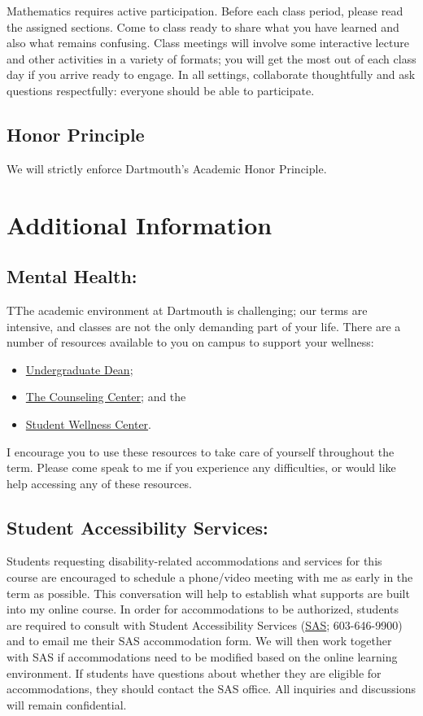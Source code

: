 \documentclass[11pt,letterpaper]{article}
\newcommand{\pageheading}[1]{\section*{#1}\addcontentsline{toc}{section}{#1}}
\begin{document}
Mathematics requires active participation. Before each class period, please read the assigned sections. Come to class ready to share what you have learned and also what remains confusing. Class meetings will involve some interactive lecture and other activities in a variety of formats; you will get the most out of each class day if you arrive ready to engage. In all settings, collaborate thoughtfully and ask questions respectfully: everyone should be able to participate.

\subsection*{Honor Principle}

We will strictly enforce Dartmouth's Academic Honor Principle.

\clearpage
\pageheading{Additional Information}

\subsection*{Mental Health:}

TThe academic environment at Dartmouth is challenging; our terms are intensive, and classes are not the only demanding part of your life. There are a number of resources available to you on campus to support your wellness:

\begin{itemize}
\item \href{https://students.dartmouth.edu/undergraduate-deans/}{Undergraduate Dean};
\item \href{https://students.dartmouth.edu/health-service/counseling/about}{The Counseling Center}; and the
\item \href{https://students.dartmouth.edu/wellness-center/}{Student Wellness Center}.
\end{itemize}

I encourage you to use these resources to take care of yourself throughout the term. Please come speak to me if you experience any difficulties, or would like help accessing any of these resources.

\subsection*{Student Accessibility Services:}

Students requesting disability-related accommodations and services for this course are encouraged to schedule a phone/video meeting with me as early in the term as possible. This conversation will help to establish what supports are built into my online course. In order for accommodations to be authorized, students are required to consult with Student Accessibility Services (\href{https://www.juliettebruce.xyz/teaching/student.accessibility.services@dartmouth.edu}{SAS}; 603-646-9900) and to email me their SAS accommodation form. We will then work together with SAS if accommodations need to be modified based on the online learning environment. If students have questions about whether they are eligible for accommodations, they should contact the SAS office. All inquiries and discussions will remain confidential.
\end{document}
